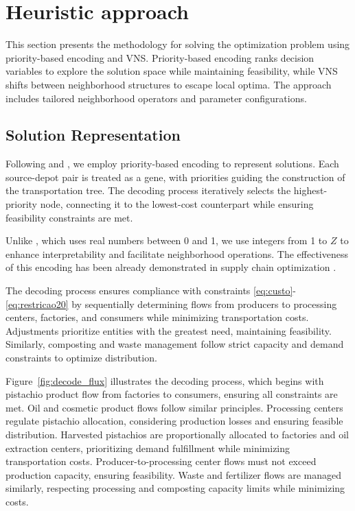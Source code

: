\documentclass[a4paper]{ifacconf}
\begin{document}

\section{Heuristic approach}
\label{sec:heuristic}

This section presents the methodology for solving the optimization problem using priority-based encoding \citep{gen2006genetic} and VNS. Priority-based encoding ranks decision variables to explore 
the solution space while maintaining feasibility, while VNS shifts between neighborhood structures to escape local optima. The approach includes tailored neighborhood operators and parameter configurations.

\subsection{Solution Representation}
Following \cite{rajabi2023utilizing} and \cite{gen2006genetic}, we employ priority-based encoding to represent solutions. Each source-depot pair is treated as a gene, with priorities guiding 
the construction of the transportation tree. The decoding process iteratively selects the highest-priority node, connecting it to the lowest-cost counterpart while ensuring feasibility constraints are met.

Unlike \cite{rajabi2023utilizing}, which uses real numbers between 0 and 1, we use integers from 1 to $Z$ to enhance interpretability and facilitate neighborhood operations. The effectiveness 
of this encoding has been already demonstrated in supply chain optimization \citep{pishvaee2010memetic,altiparmak2006genetic,liu2023integrated}.

The decoding process ensures compliance with constraints \eqref{eq:custo}-\eqref{eq:restricao20} by sequentially determining flows from producers to processing centers, factories, and consumers 
while minimizing transportation costs. Adjustments prioritize entities with the greatest need, maintaining feasibility. Similarly, composting and waste management follow strict capacity and demand 
constraints to optimize distribution.

Figure~\ref{fig:decode_flux} illustrates the decoding process, which begins with pistachio product flow from factories to consumers, ensuring all constraints are met. 
Oil and cosmetic product flows follow similar principles. Processing centers regulate pistachio allocation, considering production losses and ensuring feasible distribution. 
Harvested pistachios are proportionally allocated to factories and oil extraction centers, prioritizing demand fulfillment while minimizing transportation costs. 
Producer-to-processing center flows must not exceed production capacity, ensuring feasibility. Waste and fertilizer flows are managed similarly, respecting processing and composting capacity limits 
while minimizing costs.
\end{document}
